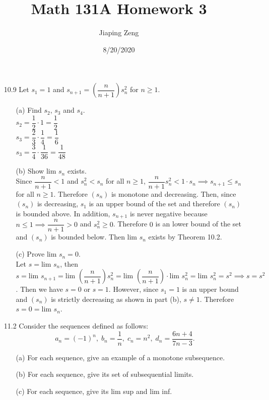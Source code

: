\documentclass{article}
\title{Math 131A Homework 3}
\date{8/20/2020}
\author{Jiaping Zeng}
\begin{document}
\maketitle

\begin{itemize}
    \item [10.9] Let $s_1=1$ and $s_{n+1}=(\dfrac{n}{n+1})s_n^2$ for $n\geq 1$.
          \begin{itemize}
              \item [(a)] Find $s_2$, $s_3$ and $s_4$.\\
                    $s_2=\dfrac{1}{2}\cdot 1=\dfrac{1}{2}$\\$s_3=\dfrac{2}{3}\cdot\dfrac{1}{4}=\dfrac{1}{6}$\\$s_3=\dfrac{3}{4}\cdot\dfrac{1}{36}=\dfrac{1}{48}$
              \item [(b)] Show $\text{lim }s_n$ exists.\\
                    Since $\dfrac{n}{n+1}<1$ and $s_n^2<s_n$ for all $n\geq 1$, $\dfrac{n}{n+1}s_n^2<1\cdot s_n\implies s_{n+1}\leq s_n$ for all $n\geq 1$. Therefore $(s_n)$ is monotone and decreasing. Then, since $(s_n)$ is decreasing, $s_1$ is an upper bound of the set and therefore $(s_n)$ is bounded above. In addition, $s_{n+1}$ is never negative because $n\leq 1\implies\dfrac{n}{n+1}>0$ and $s_n^2\geq 0$. Therefore $0$ is an lower bound of the set and $(s_n)$ is bounded below. Then $\text{lim }s_n$ exists by Theorem 10.2.
              \item [(c)] Prove $\text{lim }s_n=0$.\\
                    Let $s=\text{lim }s_n$, then $s=\text{lim }s_{n+1}=\text{lim }(\dfrac{n}{n+1})s_n^2=\text{lim }(\dfrac{n}{n+1})\cdot\text{lim }s_n^2=\text{lim }s_n^2=s^2\implies s=s^2$. Then we have $s=0$ or $s=1$. However, since $s_1=1$ is an upper bound and $(s_n)$ is strictly decreasing as shown in part (b), $s\neq 1$. Therefore $s=0=\text{lim }s_n$.
          \end{itemize}
    \item [11.2] Consider the sequences defined as follows:\[a_n=(-1)^n,\;b_n=\dfrac{1}{n},\; c_n=n^2,\;d_n=\dfrac{6n+4}{7n-3}.\]
          \begin{itemize}
              \item [(a)] For each sequence, give an example of a monotone subsequence.
              \item [(b)] For each sequence, give its set of subsequential limits.
              \item [(c)] For each sequence, give its lim sup and lim inf.

\end{itemize}
\end{itemize}
\end{document}
